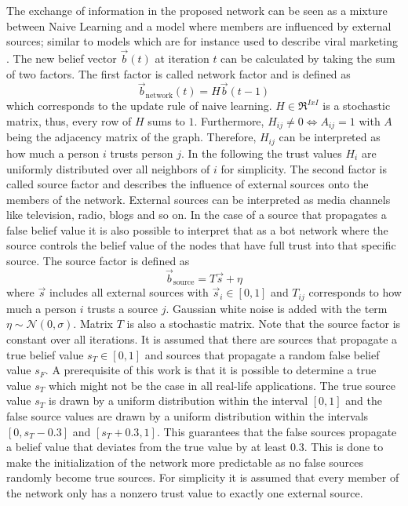 \documentclass[11pt, a4paper]{article}
\newcommand{\matr}[1]{\bm{\mathit{#1}}}
\begin{document}
The exchange of information in the proposed network can be seen as a mixture between Naive Learning \cite{NaiveLearning1,NaiveLearning2,NaiveLearning3} and a model where members are influenced by external sources; similar to models which are for instance used to describe viral marketing \cite{viral_marketing1, viral_marketing_2, viral_marketing_3}. The new belief vector $\vec{b}(t)$ at iteration $t$ can be calculated by taking the sum of two factors. The first factor is called network factor and is defined as 
%
\begin{equation}
	\vec{b}_\text{network}(t) = \matr{H} \vec{b}(t-1)
\end{equation} 
%
which corresponds to the update rule of naive learning. $\matr{H} \in \Re^{IxI}$ is a stochastic matrix, thus, every row of $\matr{H}$ sums to $1$. Furthermore, $\matr{H}_{ij} \neq 0 \Leftrightarrow \matr{A}_{ij} = 1$ with $\matr{A}$ being the adjacency matrix of the graph. Therefore, $\matr{H}_{ij}$ can be interpreted as how much a person $i$ trusts person $j$. In the following the trust values $\matr{H}_{i}$ are uniformly distributed over all neighbors of $i$ for simplicity. \newline
The second factor is called source factor and describes the influence of external sources onto the members of the network. External sources can be interpreted as media channels like television, radio, blogs and so on. In the case of a source that propagates a false belief value it is also possible to interpret that as a bot network where the source controls the belief value of the nodes that have full trust into that specific source. The source factor is defined as
%
\begin{equation}
	\vec{b}_\text{source} = \matr{T} \vec{s}+\eta
\end{equation}
%
where $\vec{s}$ includes all external sources with $\vec{s}_i \in [0,1]$ and $\matr{T}_{ij}$ corresponds to how much a person $i$ trusts a source $j$. Gaussian white noise is added with the term $\eta \sim \mathcal{N}(0,\sigma)$. Matrix $\matr{T}$ is also a stochastic matrix. Note that the source factor is constant over all iterations. It is assumed that there are sources that propagate a true belief value $s_T \in [0,1]$ and sources that propagate a random false belief value $s_F$. A prerequisite of this work is that it is possible to determine a true value $s_T$ which might not be the case in all real-life applications. The true source value $s_T$ is drawn by a uniform distribution within the interval $[0,1]$ and the false source values are drawn by a uniform distribution within the intervals $[0, s_T-0.3]$ and $[s_T+0.3,1]$. This guarantees that the false sources propagate a belief value that deviates from the true value by at least $0.3$. This is done to make the initialization of the network more predictable as no false sources randomly become true sources. For simplicity it is assumed that every member of the network only has a nonzero trust value to exactly one external source.\newline
\end{document}
